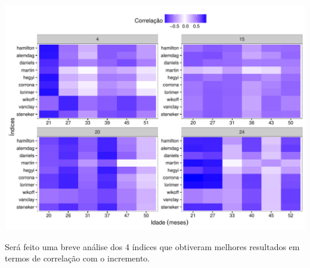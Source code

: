 \documentclass[article]{jss}
\begin{document}
\begin{CodeChunk}


\begin{center}\includegraphics{comp3-paper_files/figure-latex/unnamed-chunk-14-1} \end{center}

\end{CodeChunk}

Será feito uma breve análise dos 4 índices que obtiveram melhores
resultados em termos de correlação com o incremento.

\subsection{}\label{section}
\end{document}
